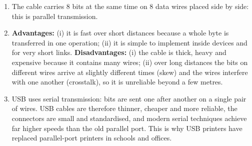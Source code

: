 \documentclass[11pt]{article}
\newcommand{\cle}[1]{{\popxbold\color{popdark}#1}}
\begin{document}
\begin{corrige}
\begin{enumerate}
\item The cable carries 8 bits at the same time on 8 data wires placed side by side: this is \cle{parallel transmission}.
\item \textbf{Advantages:} (i) it is fast over short distances because a whole byte is transferred in one operation; (ii) it is simple to implement inside devices and for very short links. \textbf{Disadvantages:} (i) the cable is thick, heavy and expensive because it contains many wires; (ii) over long distances the bits on different wires arrive at slightly different times (skew) and the wires interfere with one another (crosstalk), so it is unreliable beyond a few metres.
\item USB uses \cle{serial transmission}: bits are sent one after another on a single pair of wires. USB cables are therefore thinner, cheaper and more reliable, the connectors are small and standardised, and modern serial techniques achieve far higher speeds than the old parallel port. This is why USB printers have replaced parallel-port printers in schools and offices.
\end{enumerate}
\end{corrige}
\end{document}
